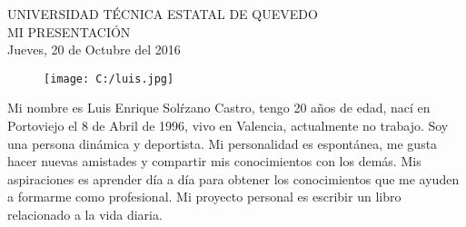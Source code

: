 \documentclass [12pt] {article}
\begin{document}
\begin{center}
UNIVERSIDAD T\'ECNICA ESTATAL DE QUEVEDO\\
\vspace{1cm}
MI PRESENTACI\'ON\\
\vspace{0.5cm}
Jueves, 20 de Octubre del 2016
\end{center}

\begin{figure}[h]
\begin{center}
\texttt{[image: C:/luis.jpg]}
\end{center}
\end{figure}

Mi nombre es Luis Enrique Sol\'rzano Castro, tengo 20 a\~nos de edad, nac\'i en Portoviejo el 8 de Abril de 1996, vivo en Valencia, actualmente no trabajo. Soy una persona din\'amica y deportista. Mi personalidad es espont\'anea, me gusta hacer nuevas amistades y compartir mis conocimientos con los dem\'as. Mis aspiraciones es aprender d\'ia a d\'ia para obtener los conocimientos que me ayuden a formarme como profesional. Mi proyecto personal es escribir un libro relacionado a la vida diaria.
\newline
\end{document}
